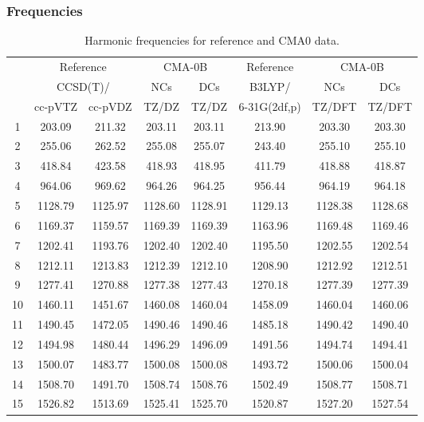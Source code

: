\documentclass[10pt,oneside]{article}
\begin{document}
\subsubsection*{Frequencies}
\begin{table}[h!]
\centering
\caption{Harmonic frequencies for reference and CMA0 data.}
\begin{tabular}{cccccccc}
\toprule
{} & \multicolumn{2}{c}{Reference} & \multicolumn{2}{c}{CMA-0B} &    Reference & \multicolumn{2}{c}{CMA-0B} \\
{} & \multicolumn{2}{c}{CCSD(T)/} &     NCs &     DCs &       B3LYP/ &     NCs &     DCs \\
{} &   cc-pVTZ & cc-pVDZ &   TZ/DZ &   TZ/DZ & 6-31G(2df,p) &  TZ/DFT &  TZ/DFT \\
\midrule
1  &    203.09 &  211.32 &  203.11 &  203.11 &       213.90 &  203.30 &  203.30 \\
2  &    255.06 &  262.52 &  255.08 &  255.07 &       243.40 &  255.10 &  255.10 \\
3  &    418.84 &  423.58 &  418.93 &  418.95 &       411.79 &  418.88 &  418.87 \\
4  &    964.06 &  969.62 &  964.26 &  964.25 &       956.44 &  964.19 &  964.18 \\
5  &   1128.79 & 1125.97 & 1128.60 & 1128.91 &      1129.13 & 1128.38 & 1128.68 \\
6  &   1169.37 & 1159.57 & 1169.39 & 1169.39 &      1163.96 & 1169.48 & 1169.46 \\
7  &   1202.41 & 1193.76 & 1202.40 & 1202.40 &      1195.50 & 1202.55 & 1202.54 \\
8  &   1212.11 & 1213.83 & 1212.39 & 1212.10 &      1208.90 & 1212.92 & 1212.51 \\
9  &   1277.41 & 1270.88 & 1277.38 & 1277.43 &      1270.18 & 1277.39 & 1277.39 \\
10 &   1460.11 & 1451.67 & 1460.08 & 1460.04 &      1458.09 & 1460.04 & 1460.06 \\
11 &   1490.45 & 1472.05 & 1490.46 & 1490.46 &      1485.18 & 1490.42 & 1490.40 \\
12 &   1494.98 & 1480.44 & 1496.29 & 1496.09 &      1491.56 & 1494.74 & 1494.41 \\
13 &   1500.07 & 1483.77 & 1500.08 & 1500.08 &      1493.72 & 1500.06 & 1500.04 \\
14 &   1508.70 & 1491.70 & 1508.74 & 1508.76 &      1502.49 & 1508.77 & 1508.71 \\
15 &   1526.82 & 1513.69 & 1525.41 & 1525.70 &      1520.87 & 1527.20 & 1527.54 \\

\end{tabular}
\end{table}
\end{document}
